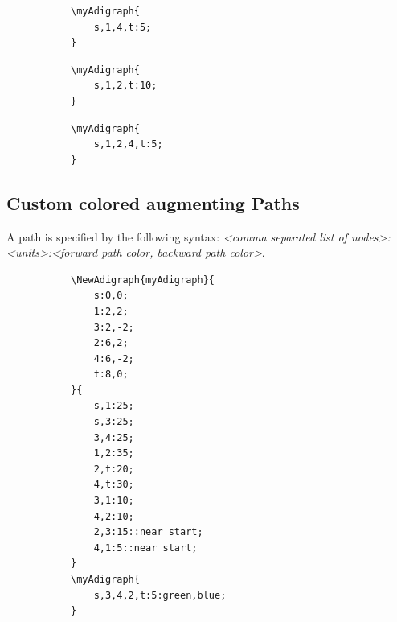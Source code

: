 \documentclass{report}
\begin{document}
\begin{figure}
	\begin{subfigure}{0.49\textwidth}
		\begin{verbatim}
\myAdigraph{
	s,1,4,t:5;
}
\end{verbatim}
	\end{subfigure}
	\begin{subfigure}{0.49\textwidth}
	\end{subfigure}
\end{figure}

\begin{figure}
	\begin{subfigure}{0.49\textwidth}
		\begin{verbatim}
\myAdigraph{
	s,1,2,t:10;
}
\end{verbatim}
	\end{subfigure}
	\begin{subfigure}{0.49\textwidth}
	\end{subfigure}
\end{figure}

\begin{figure}
	\begin{subfigure}{0.49\textwidth}
		\begin{verbatim}
\myAdigraph{
	s,1,2,4,t:5;
}
\end{verbatim}
	\end{subfigure}
	\begin{subfigure}{0.49\textwidth}
	\end{subfigure}
\end{figure}

\subsection{Custom colored augmenting Paths}
A path is specified by the following syntax: \textit{<comma separated list of nodes>:<units>:<forward path color, backward path color>}.


\begin{figure}
	\begin{subfigure}{0.49\textwidth}
		\begin{verbatim}
\NewAdigraph{myAdigraph}{
	s:0,0;
	1:2,2;
	3:2,-2;
	2:6,2;
	4:6,-2;
	t:8,0;
}{
	s,1:25;
	s,3:25;
	3,4:25;
	1,2:35;
	2,t:20;
	4,t:30;
	3,1:10;
	4,2:10;
	2,3:15::near start;
	4,1:5::near start;
}
\myAdigraph{
	s,3,4,2,t:5:green,blue;
}
\end{verbatim}
	\end{subfigure}
	\begin{subfigure}{0.49\textwidth}
	\end{subfigure}
\end{figure}
\end{document}

